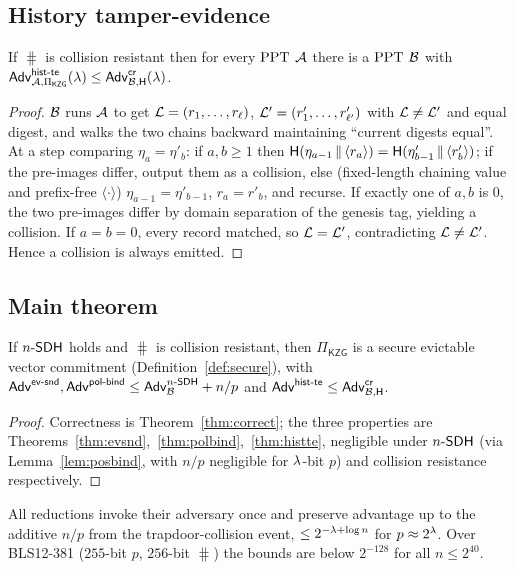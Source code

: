 \subsection{History tamper-evidence}

\begin{theorem}\label{thm:histte}
If $\hash$ is collision resistant then for every $\mathrm{PPT}$ $\mathcal{A}$ there is a $\mathrm{PPT}$
$\mathcal{B}$ with $\mathsf{Adv}^{\mathsf{hist\text{-}te}}_{\mathcal{A},\Pi_{\mathsf{KZG}}}(\lambda)\le
\mathsf{Adv}^{\mathsf{cr}}_{\mathcal{B},\mathsf{H}}(\lambda)$.
\end{theorem}
\begin{proof}
$\mathcal{B}$ runs $\mathcal{A}$ to get $\mathcal{L}=(r_1,\dots,r_\ell)$, $\mathcal{L}'=(r'_1,\dots,r'_{\ell'})$
with $\mathcal{L}\neq\mathcal{L}'$ and equal digest, and walks the two chains backward
maintaining ``current digests equal''. At a step comparing $\eta_a=\eta'_b$: if
$a,b\ge1$ then $\mathsf{H}(\eta_{a-1}\,\|\,\langle r_a\rangle)=\mathsf{H}(\eta'_{b-1}
\,\|\,\langle r'_b\rangle)$; if the pre-images differ, output them as a
collision, else (fixed-length chaining value and prefix-free $\langle\cdot
\rangle$) $\eta_{a-1}=\eta'_{b-1}$, $r_a=r'_b$, and recurse. If exactly one of
$a,b$ is $0$, the two pre-images differ by domain separation of the genesis tag,
yielding a collision. If $a=b=0$, every record matched, so $\mathcal{L}=\mathcal{L}'$,
contradicting $\mathcal{L}\neq\mathcal{L}'$. Hence a collision is always emitted.
\end{proof}

\subsection{Main theorem}

\begin{theorem}\label{thm:main}
If $n\text{-}\mathsf{SDH}$ holds and $\hash$ is collision resistant, then $\Pi_{\mathsf{KZG}}$ is
a secure evictable vector commitment (Definition~\ref{def:secure}), with
$\mathsf{Adv}^{\mathsf{ev\text{-}snd}},\mathsf{Adv}^{\mathsf{pol\text{-}bind}}\le\mathsf{Adv}^{n\text{-}\mathsf{SDH}}_{\mathcal{B}}+n/p$ and
$\mathsf{Adv}^{\mathsf{hist\text{-}te}}\le\mathsf{Adv}^{\mathsf{cr}}_{\mathcal{B},\mathsf{H}}$.
\end{theorem}
\begin{proof}
Correctness is Theorem~\ref{thm:correct}; the three properties are
Theorems~\ref{thm:evsnd},~\ref{thm:polbind},~\ref{thm:histte}, negligible under
$n\text{-}\mathsf{SDH}$ (via Lemma~\ref{lem:posbind}, with $n/p$ negligible for $\lambda$-bit
$p$) and collision resistance respectively.
\end{proof}

\begin{remark}
All reductions invoke their adversary once and preserve advantage up to the
additive $n/p$ from the trapdoor-collision event, $\le 2^{-\lambda+\log n}$ for
$p\approx2^{\lambda}$. Over BLS12-381 ($255$-bit $p$, $256$-bit $\hash$) the
bounds are below $2^{-128}$ for all $n\le2^{40}$.
\end{remark}

